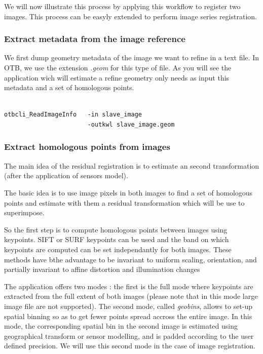We will now illustrate this process by applying this workflow to register two
images. This process can be easyly extended to perform image series
registration.


\subsubsection{Extract metadata from the image reference}

We first dump geometry metadata of the image we want to refine in a text
file. In OTB, we use the extension \textit{.geom} for this type of file. As you
will see the application wich will estimate a refine geometry only needs as
input this metadata and a set of homologous points.

\begin{verbatim}

otbcli_ReadImageInfo   -in slave_image 
                       -outkwl slave_image.geom 

\end{verbatim}


\subsubsection{Extract homologous points from images}

The main idea of the residual registration is to estimate an second
transformation (after the application of sensors model).

The basic idea is to use image pixels in both images to find a set of homologous
points and estimate with them a residual transformation which will be use to
superimpose.
  
So the first step is to compute homologous points between images using
keypoints. SIFT or SURF keypoints can be used and the band on which keypoints
are computed can be set independantly for both images. These methods have bthe
advantage to be invariant to uniform scaling, orientation, and partially
invariant to affine distortion and illumination changes

The application offers two modes : the first is the full mode where keypoints
are extracted from the full extent of both images (please note that in this mode
large image file are not supported). The second mode, called \textit{geobins},
allows to set-up spatial binning so as to get fewer points spread accross the
entire image. In this mode, the corresponding spatial bin in the second image is
estimated using geographical transform or sensor modelling, and is padded
according to the user defined precision. We will use this second mode in the
case of image registration.

